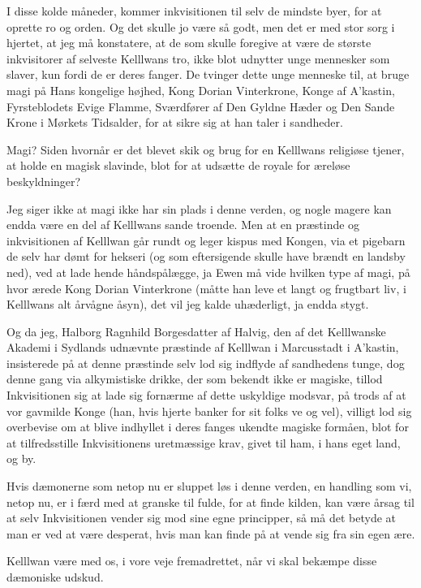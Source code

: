 \documentclass[letterpaper,12pt]{memoir}
\begin{document}
I disse kolde måneder, kommer inkvisitionen til selv de mindste byer, for at oprette ro og orden. Og det skulle jo være så godt, men det er med stor sorg i hjertet, at jeg må konstatere, at de som skulle foregive at være de største inkvisitorer af selveste Kelllwans tro, ikke blot udnytter unge mennesker som slaver, kun fordi de er deres fanger. De tvinger dette unge menneske til, at bruge magi på Hans kongelige højhed, Kong Dorian Vinterkrone, Konge af A’kastin, Fyrsteblodets Evige Flamme, Sværdfører af Den Gyldne Hæder og Den Sande Krone i Mørkets Tidsalder, for at sikre sig at han taler i sandheder.

Magi? Siden hvornår er det blevet skik og brug for en Kelllwans religiøse tjener, at holde en magisk slavinde, blot for at udsætte de royale for æreløse beskyldninger?

Jeg siger ikke at magi ikke har sin plads i denne verden, og nogle magere kan endda være en del af Kelllwans sande troende. Men at en præstinde og inkvisitionen af Kelllwan går rundt og leger kispus med Kongen, via et pigebarn de selv har dømt for hekseri (og som eftersigende skulle have brændt en landsby ned), ved at lade hende håndspålægge, ja Ewen må vide hvilken type af magi, på hvor ærede Kong Dorian Vinterkrone (måtte han leve et langt og frugtbart liv, i Kelllwans alt årvågne åsyn), det vil jeg kalde uhæderligt, ja endda stygt.

Og da jeg, Halborg Ragnhild Borgesdatter af Halvig, den af det Kelllwanske Akademi i Sydlands udnævnte præstinde af Kelllwan i Marcusstadt i A’kastin, insisterede på at denne præstinde selv lod sig indflyde af sandhedens tunge, dog denne gang via alkymistiske drikke, der som bekendt ikke er magiske, tillod Inkvisitionen sig at lade sig fornærme af dette uskyldige modsvar, på trods af at vor gavmilde Konge (han, hvis hjerte banker for sit folks ve og vel), villigt lod sig overbevise om at blive indhyllet i deres fanges ukendte magiske formåen, blot for at tilfredsstille Inkvisitionens uretmæssige krav, givet til ham, i hans eget land, og by.

Hvis dæmonerne som netop nu er sluppet løs i denne verden, en handling som vi, netop nu, er i færd med at granske til fulde, for at finde kilden, kan være årsag til at selv Inkvisitionen vender sig mod sine egne principper, så må det betyde at man er ved at være desperat, hvis man kan finde på at vende sig fra sin egen ære.

Kelllwan være med os, i vore veje fremadrettet, når vi skal bekæmpe disse dæmoniske udskud.
\end{document}
